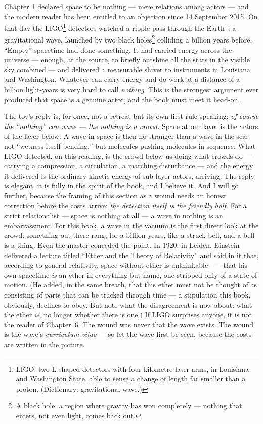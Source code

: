 \documentclass[fontsize=11pt,paper=a4,pagesize=auto,parskip=half-]{scrbook}
\begin{document}
Chapter 1 declared space to be nothing --- mere relations among actors --- and the modern reader has been entitled to an objection since 14 September 2015. On that day the LIGO\footnote{LIGO: two L-shaped detectors with four-kilometre laser arms, in Louisiana and Washington State, able to sense a change of length far smaller than a proton. (Dictionary: gravitational wave.)} detectors watched a ripple pass through the Earth~\cite{ligo2016}: a gravitational wave, launched by two black holes\footnote{A black hole: a region where gravity has won completely --- nothing that enters, not even light, comes back out.} colliding a billion years before. ``Empty'' spacetime had done something. It had carried energy across the universe --- enough, at the source, to briefly outshine all the stars in the visible sky combined --- and delivered a measurable shiver to instruments in Louisiana and Washington. Whatever can carry energy and do work at a distance of a billion light-years is very hard to call \emph{nothing}. This is the strongest argument ever produced that space is a genuine actor, and the book must meet it head-on.

The toy's reply is, for once, not a retreat but its own first rule speaking: \emph{of course the ``nothing'' can wave --- the nothing is a crowd.} Space at our layer is the actors of the layer below. A wave in space is then no stranger than a wave in the sea: not ``wetness itself bending,'' but molecules pushing molecules in sequence. What LIGO detected, on this reading, is the crowd below us doing what crowds do --- carrying a compression, a circulation, a marching disturbance --- and the energy it delivered is the ordinary kinetic energy of sub-layer actors, arriving. The reply is elegant, it is fully in the spirit of the book, and I believe it. And I will go further, because the framing of this section as a wound needs an honest correction before the costs arrive: \emph{the detection itself is the friendly half.} For a strict relationalist --- space is nothing at all --- a wave in nothing is an embarrassment. For this book, a wave in the vacuum is the first direct look at the crowd: something out there rang, for a billion years, like a struck bell, and a bell is a thing. Even the master conceded the point. In 1920, in Leiden, Einstein delivered a lecture titled ``Ether and the Theory of Relativity'' and said in it that, according to general relativity, space without ether is unthinkable~\cite{einstein1920} --- that his own spacetime \emph{is} an ether in everything but name, one stripped only of a state of motion. (He added, in the same breath, that this ether must not be thought of as consisting of parts that can be tracked through time --- a stipulation this book, obviously, declines to obey. But note what the disagreement is now about: what the ether \emph{is}, no longer whether there is one.) If LIGO surprises anyone, it is not the reader of Chapter~6. The wound was never that the wave exists. The wound is the wave's \emph{curriculum vitae} --- so let the wave first be seen, because the costs are written in the picture.
\end{document}
